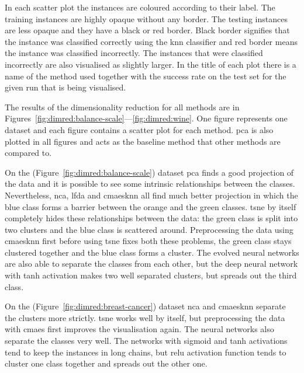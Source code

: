 \documentclass[12pt,a4paper]{report}
\begin{document}
In each scatter plot the instances are coloured according to their label. The training instances are highly opaque without any border. The testing instances are less opaque and they have a black or red border. Black border signifies that the instance was classified correctly using the \ac{knn} classifier and red border means the instance was classified incorrectly. The instances that were classified incorrectly are also visualised as slightly larger. In the title of each plot there is a name of the method used together with the success rate on the test set for the given run that is being visualised.

The results of the dimensionality reduction for all methods are in Figures~\ref{fig:dimred:balance-scale}---\ref{fig:dimred:wine}. One figure represents one dataset and each figure contains a scatter plot for each method. \ac{pca} is also plotted in all figures and acts as the baseline method that other methods are compared to. 

On the  (Figure~\ref{fig:dimred:balance-scale}) dataset \ac{pca} finds a good projection of the data and it is possible to see some intrinsic relationships between the classes. Nevertheless, \ac{nca}, \ac{lfda} and \ac{cmaesknn} all find much better projection in which the blue class forms a barrier between the orange and the green classes. \ac{tsne} by itself completely hides these relationships between the data: the green class is split into two clusters and the blue class is scattered around. Preprocessing the data using \ac{cmaesknn} first before using \ac{tsne} fixes both these problems, the green class stays clustered together and the blue class forms a cluster. The evolved neural networks are also able to separate the classes from each other, but the deep neural network with \ac{tanh} activation makes two well separated clusters, but spreads out the third class.

On the  (Figure~\ref{fig:dimred:breast-cancer}) dataset \ac{nca} and \ac{cmaesknn} separate the clusters more strictly. \ac{tsne} works well by itself, but preprocessing the data with \ac{cmaes} first improves the visualisation again. The neural networks also separate the classes very well. The networks with sigmoid and \ac{tanh} activations tend to keep the instances in long chains, but \ac{relu} activation function tends to cluster one class together and spreads out the other one.
\end{document}
